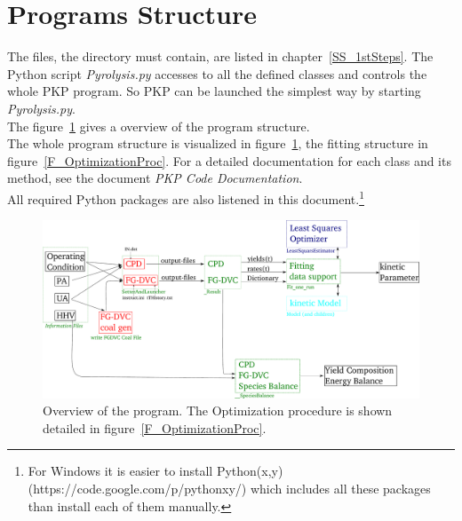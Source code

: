\section{Programs Structure}\label{S_Program}
The files, the directory must contain, are listed in chapter~\ref{SS_1stSteps}. The Python script \emph{Pyrolysis.py} accesses to all the defined classes and controls the whole PKP program. So PKP can be launched the simplest way by starting \emph{Pyrolysis.py}.\\
The figure~\ref{F_Structure} gives a overview of the program structure.\\

The whole program structure is visualized in figure~\ref{F_Structure}, the fitting structure in figure~\ref{F_OptimizationProc}. For a detailed documentation for each class and its method, see the document \emph{PKP Code Documentation}.\\
All required Python packages are also listened in this document.\footnote{For Windows it is easier to install Python(x,y) (https://code.google.com/p/pythonxy/) which includes all these packages than install each of them manually.}

\begin{figure}
\centering%
\includegraphics[width=22cm,angle=90]{Figures/Programstructure}
\caption{Overview of the program. The Optimization procedure is shown detailed in figure~\ref{F_OptimizationProc}.}
\label{F_Structure}
\end{figure}

